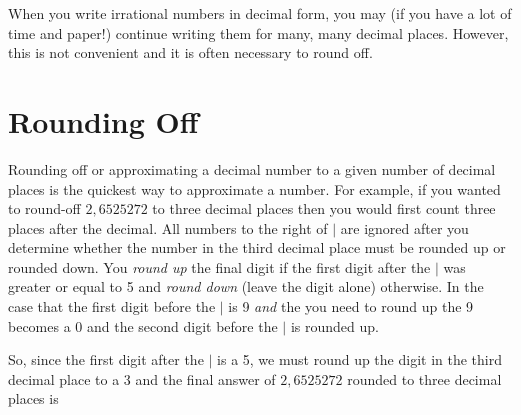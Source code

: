 \documentclass[10pt,a4paper,titlepage,twoside,openright]{report}
\begin{document}
When you write irrational numbers in decimal form, you may (if you have a lot of time and paper!) continue writing them for many, many decimal places. However, this is not convenient and it is often necessary to round off.


\section{Rounding Off}

Rounding off or approximating a decimal number to a given number of decimal places is the quickest way to approximate a number. For example, if you wanted to round-off $2,6525272$ to three decimal places then you would first count three places after the decimal.
All numbers to the right of $|$ are ignored after you determine whether the number in the third decimal place must be rounded up or rounded down. You \textit{round up} the final digit if the first digit after the $|$ was greater or equal to 5 and \textit{round down} (leave the digit alone) otherwise. In the case that the first digit before the $|$ is 9 \textit{and} the you need to round up the 9 becomes a 0 and the second digit before the $|$ is rounded up.

So, since the first digit after the $|$ is a 5, we must round up the digit in the third decimal place to a 3 and the final answer of $2,6525272$ rounded to three decimal places is
\end{document}
